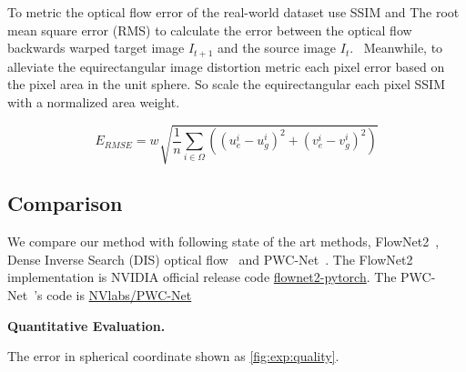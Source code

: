 To metric the optical flow error of the real-world dataset use SSIM and The root mean square error (RMS) to calculate the error between the optical flow backwards warped target image $I_{t+1}$ and the source image $I_t$.~\cite{??}
Meanwhile, to alleviate the equirectangular image distortion metric each pixel error based on the pixel area in the unit sphere.
So scale the equirectangular each pixel SSIM with a normalized area weight.

\begin{equation}\label{equ:exp:rmsesph}
	E_{RMSE} = w_{} \sqrt{\frac{1}{n} \sum_{i \in \Omega}((u_e^i - u_g^i)^2 + (v_e^i - v_g^i)^2)}
\end{equation}


\subsection{Comparison}

We compare our method with following state of the art methods, FlowNet2~\cite{IlgMSKDB2017}, Dense Inverse Search (DIS) optical flow~\cite{KroegTDV2016} and PWC-Net~\cite{SunYLK2018}. 
The FlowNet2~\cite{IlgMSKDB2017} implementation is NVIDIA official release code \href{https://github.com/NVIDIA/flownet2-pytorch}{flownet2-pytorch}.
The PWC-Net~\cite{SunYLK2018}'s code is \href{https://github.com/NVlabs/PWC-Net}{NVlabs/PWC-Net}

\textbf{Quantitative Evaluation.}

The error in spherical coordinate shown as \cref{fig:exp:quality}.



